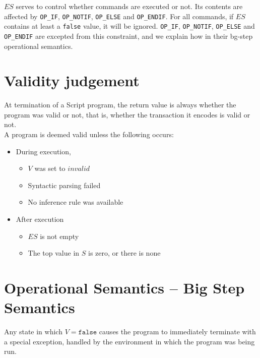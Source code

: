 \documentclass{article}
\begin{document}
\noindent
$ES$ serves to control whether commands are executed or not. Its contents are affected by \texttt{OP\_IF}, \texttt{OP\_NOTIF}, \texttt{OP\_ELSE} and \texttt{OP\_ENDIF}. For all commands, if $ES$ contains at least a \texttt{false} value, it will be ignored. \texttt{OP\_IF}, \texttt{OP\_NOTIF}, \texttt{OP\_ELSE} and \texttt{OP\_ENDIF} are excepted from this constraint, and we explain how in their bg-step operational semantics.

\section{Validity judgement}

At termination of a Script program, the return value is always whether the program was valid or not, that is, whether the transaction it encodes is valid or not.\\

\noindent
A program is deemed valid unless the following occurs:

\begin{itemize}
    \item During execution, 
        \begin{itemize}
            \item $V$ was set to $invalid$
            \item Syntactic parsing failed
            \item No inference rule was available
        \end{itemize} 

    \item After execution
        \begin{itemize}
            \item $ES$ is not empty
            \item The top value in $S$ is zero, or there is none
        \end{itemize} 
\end{itemize} 


\hypertarget{OPSEM}{\section{Operational Semantics -- Big Step Semantics}}




Any state in which $V = \texttt{false}$ causes the program to immediately terminate with a special exception, handled by the environment in which the program was being run.
\end{document}
